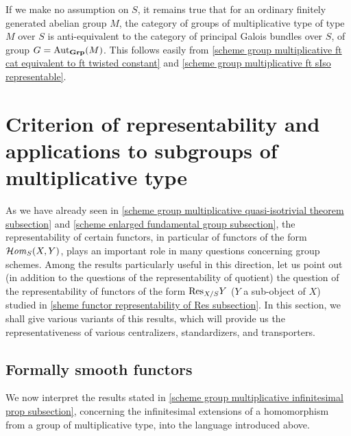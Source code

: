 \begin{remark}
If we make no assumption on $S$, it remains true that for an ordinary finitely generated abelian group $M$, the category of groups of multiplicative type of type $M$ over $S$ is anti-equivalent to the category of principal Galois bundles over $S$, of group $G=\mathrm{Aut}_{\mathbf{Grp}}(M)$. This follows easily from \cref{scheme group multiplicative ft cat equivalent to ft twisted constant} and \cref{scheme group multiplicative ft sIso representable}.
\end{remark}

\section{Criterion of representability and applications to subgroups of multiplicative type}
As we have already seen in \autoref{scheme group multiplicative quasi-isotrivial theorem subsection} and \autoref{scheme enlarged fundamental group subsection}, the representability of certain functors, in particular of functors of the form $\operatorname{\mathcal{H}\hspace*{-0.4pt}\textit{om}\hspace{0.5pt}}_S(X,Y)$, plays an important role in many questions concerning group schemes. Among the results particularly useful in this direction, let us point out (in addition to the
questions of the representability of quotient) the question of the representability of functors of the form $\mathrm{Res}_{X/S}Y$ ($Y$ a sub-object of $X$) studied in \autoref{sheme functor representability of Res subsection}. In this section, we shall give various variants of this results, which will provide us the representativeness of various centralizers, standardizers, and transporters.

\subsection{Formally smooth functors}


We now interpret the results stated in \autoref{scheme group multiplicative infinitesimal prop subsection}, concerning the infinitesimal extensions of a homomorphism from a group of multiplicative type, into the language introduced above.

